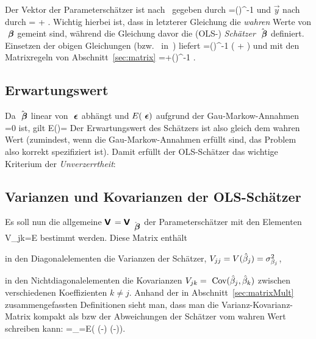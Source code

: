 Der Vektor der Parametersch\"atzer ist
nach~ gegeben durch
\bdm
\hatvecbeta =\left(\tr{}\right)^{-1}\tr{}
\edm
und $\vec{y}$ nach~ durch
\bdm
{}=\cdot \vec{\beta} + \veceps.
\edm
Wichtig hierbei ist, dass in letzterer Gleichung die \emph{wahren}
Werte von ${\mbox{ \boldmath{$\beta$}}}$ gemeint sind, w\"ahrend die Gleichung davor die
(OLS-) \emph{Sch\"atzer} $\hat{{\mbox{ \boldmath{$\beta$}}}}$ definiert.
Einsetzen der obigen Gleichungen (bzw.~
in~) liefert
\bdm
\hatvecbeta=\left(\tr{}\right)^{-1}\tr
 \left(\cdot \vec{\beta} + \veceps\right)
\edm
und mit den Matrixregeln von Abschnitt~\ref{sec:matrix}
\be
\label{betaeps}
\hatvecbeta=\vec{\beta}+\left(\tr{}\right)^{-1}
\tr\veceps.
\ee


\subsection{\label{sec:linErw}Erwartungswert}
Da $\hat{{\mbox{ \boldmath{$\beta$}}}}$ linear von ${\mbox{ \boldmath{$\epsilon$}}}$ abh\"angt und $E({\mbox{ \boldmath{$\epsilon$}}})$
aufgrund der Gau\3-Markow-Annahmen =0 ist, gilt
\be
\label{erwbeta}
E(\hatvecbeta)=\vec{\beta}
\ee
Der Erwartungswert des Sch\"atzers ist also gleich dem wahren Wert
(zumindest, wenn die Gau\3-Markow-Annahmen erf\"ullt sind, das Problem
also korrekt spezifiziert ist). Damit erf\"ullt der OLS-Sch\"atzer das
wichtige Kriterium der \emph{Unverzerrtheit}:


\subsection{\label{sec:linVar}Varianzen und Kovarianzen der OLS-Sch\"atzer}
Es soll nun die allgemeine 
$\textbf{\textsf{V}}\,=\textbf{\textsf{V}}\,_{\hat{{\mbox{ \boldmath{$\beta$}}}}}$ der Parametersch\"atzer
mit den Elementen
\be
\label{Vijbeta} 
V_{jk}=E
\ee
bestimmt werden. Diese Matrix enth\"alt
\bi
\item in den Diagonalelementen die Varianzen der Sch\"atzer,
$V_{jj}=V(\hat{\beta}_j)=\sigma_{\beta_j}^2$,
\item in den Nichtdiagonalelementen die Kovarianzen
$V_{jk}={\mbox{ Cov}}(\hat{\beta}_j,\hat{\beta}_k)$ zwischen verschiedenen
Koeffizienten $k\neq j$.
\ei
Anhand der in Abschnitt~\ref{sec:matrixMult} zusammengefassten
Definitionen sieht man, dass man die Varianz-Kovarianz-Matrix kompakt
als  bzw  der Abweichungen der Sch\"atzer vom wahren
Wert schreiben kann:
\be
\label{VbetaTensor}
=_{\hatvecbeta}=E\left( (\hatvecbeta-\vecbeta) (\hatvecbeta-\vecbeta)\tr\right).
\ee

